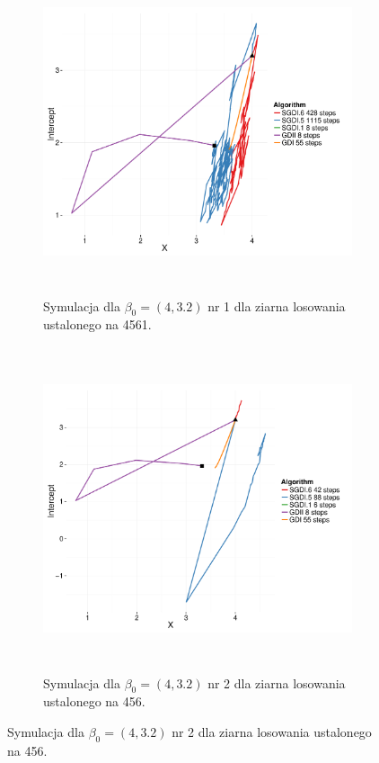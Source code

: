 \begin{figure}[hbt!]
  \begin{center}
   \begin{subfigure}[h!]{0.9\textwidth}
      \includegraphics[width=\textwidth, height=270pt]{Obrazki/sgd_32_4_1.pdf}
      \caption{Symulacja dla $\beta_0 = (4,3.2)$ nr 1 dla ziarna losowania ustalonego na 4561.}
   \end{subfigure}     
   \begin{subfigure}[h!]{0.9\textwidth}
      \includegraphics[width=\textwidth, height=270pt]{Obrazki/sgd_32_4_2.pdf}
      \caption{Symulacja dla $\beta_0 = (4,3.2)$ nr 2 dla ziarna losowania ustalonego na 456.}
   \end{subfigure}  \end{center}

\end{figure}
